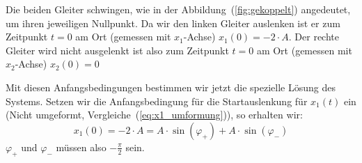 \documentclass{article}
\begin{document}
                  Die beiden Gleiter schwingen, wie in der Abbildung~(\ref{fig:gekoppelt}) angedeutet, um ihren jeweiligen Nullpunkt.
                  Da wir den linken Gleiter auslenken ist er zum Zeitpunkt \(t = 0\) am Ort (gemessen mit \(x_1\)-Achse) \(x_1(0) = -2 \cdot A \).
                  Der rechte Gleiter wird nicht ausgelenkt ist also zum Zeitpunkt \(t = 0\) am Ort (gemessen mit \(x_2\)-Achse) \(x_2(0) = 0\)

                  Mit diesen Anfangsbedingungen bestimmen wir jetzt die spezielle Lösung des Systems.
                  Setzen wir die Anfangsbedingung für die Startauslenkung für \(x_1(t)\) ein (Nicht umgeformt, Vergleiche~(\ref{eq:x1_umformung})), so erhalten wir:
                  \begin{equation}
                      x_1(0) = - 2 \cdot A = A \cdot \sin \left( \varphi_{+} \right) + A \cdot \sin \left( \varphi_{-} \right)
                  \end{equation}
                  \(\varphi_{+}\) und \( \varphi_{-} \) müssen also \(-\frac{\pi}{2}\) sein.
\end{document}
